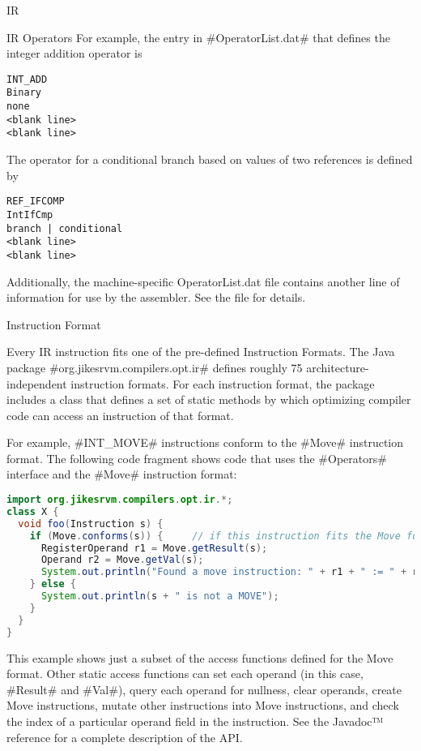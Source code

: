 \begin{section}{IR}
\begin{subsection}{IR Operators}
For example, the entry in \spverb#OperatorList.dat# that defines the integer addition operator is
\begin{lstlisting}
INT_ADD
Binary
none
<blank line>
<blank line>
\end{lstlisting}

The operator for a conditional branch based on values of two references is defined by
\begin{lstlisting}
REF_IFCOMP
IntIfCmp
branch | conditional
<blank line>
<blank line>
\end{lstlisting}
Additionally, the machine-specific OperatorList.dat file contains another line of information for use by the assembler. See the file for details.

\end{subsection}


\begin{subsection}{Instruction Format}

Every IR instruction fits one of the pre-defined Instruction Formats. The Java package \spverb#org.jikesrvm.compilers.opt.ir# defines roughly 75 architecture-independent instruction formats. For each instruction format, the package includes a class that defines a set of static methods by which optimizing compiler code can access an instruction of that format.

For example, \spverb#INT_MOVE# instructions conform to the \spverb#Move# instruction format. The following code fragment shows code that uses the \spverb#Operators# interface and the \spverb#Move# instruction format:

\begin{lstlisting}[language=Java]
import org.jikesrvm.compilers.opt.ir.*;
class X {
  void foo(Instruction s) {
    if (Move.conforms(s)) {     // if this instruction fits the Move format
      RegisterOperand r1 = Move.getResult(s);
      Operand r2 = Move.getVal(s);
      System.out.println("Found a move instruction: " + r1 + " := " + r2);
    } else {
      System.out.println(s + " is not a MOVE");
    }
  }
}
\end{lstlisting}

This example shows just a subset of the access functions defined for the Move format. Other static access functions can set each operand (in this case, \spverb#Result# and \spverb#Val#), query each operand for nullness, clear operands, create Move instructions, mutate other instructions into Move instructions, and check the index of a particular operand field in the instruction. See the Javadoc™ reference for a complete description of the API.


\end{subsection}
\end{section}
